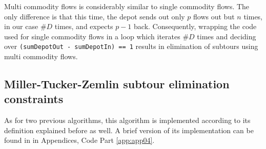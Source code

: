 Multi commodity flows is considerably similar to single commodity flows. The
only difference is that this time, the depot sends out only $p$ flows out
but $n$ times, in our case $\#D$ times, and expects $p-1$ back. Consequently,
wrapping the code used for single commodity flows in a loop which iterates $\#D$
times and deciding over \texttt{(sumDepotOut - sumDepotIn) == 1} results in
elimination of subtours using multi commodity flows.

\subsection{Miller-Tucker-Zemlin subtour elimination constraints}

As for two previous algorithms, this algorithm is implemented according to its
definition explained before as well. A brief version of its implementation can
be found in in
Appendices, Code Part \ref{app:app04}.

